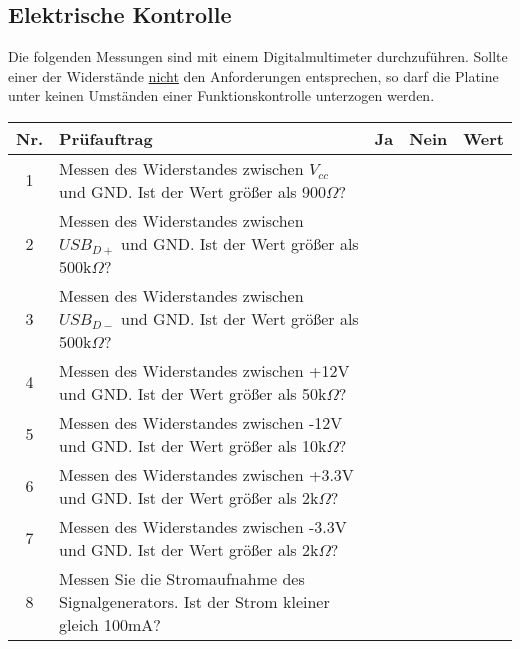 \subsection{Elektrische Kontrolle}
Die folgenden Messungen sind mit einem Digitalmultimeter durchzuführen. Sollte einer der Widerstände \underline{nicht} den Anforderungen entsprechen, so darf die Platine unter keinen Umständen einer Funktionskontrolle unterzogen werden.
\begin{flushleft}
	\begin{tabular}{|c||p{10cm}|c|c|p{2cm}|}
		\hline
		Nr. & Prüfauftrag & Ja & Nein & Wert\\
		\hline
		1 & Messen des Widerstandes zwischen $V_{cc}$ und GND. Ist der Wert größer als 900$\Omega$? & & &\\
		\hline
		2 & Messen des Widerstandes zwischen $USB_{D+}$ und GND. Ist der Wert größer als 500k$\Omega$? & & & \\
		\hline
		3 & Messen des Widerstandes zwischen $USB_{D-}$ und GND. Ist der Wert größer als 500k$\Omega$? & & & \\
		\hline
		4 & Messen des Widerstandes zwischen +12V und GND. Ist der Wert größer als 50k$\Omega$? & & & \\
		\hline
		5 & Messen des Widerstandes zwischen -12V und GND. Ist der Wert größer als 10k$\Omega$? &&& \\
		\hline
		6 & Messen des Widerstandes zwischen +3.3V und GND. Ist der Wert größer als 2k$\Omega$? &&& \\
		\hline
		7 & Messen des Widerstandes zwischen -3.3V und GND. Ist der Wert größer als 2k$\Omega$? &&& \\
		\hline
		8 & Messen Sie die Stromaufnahme des Signalgenerators. Ist der Strom kleiner gleich 100mA? &&& \\
		\hline
	\end{tabular}
\end{flushleft}

